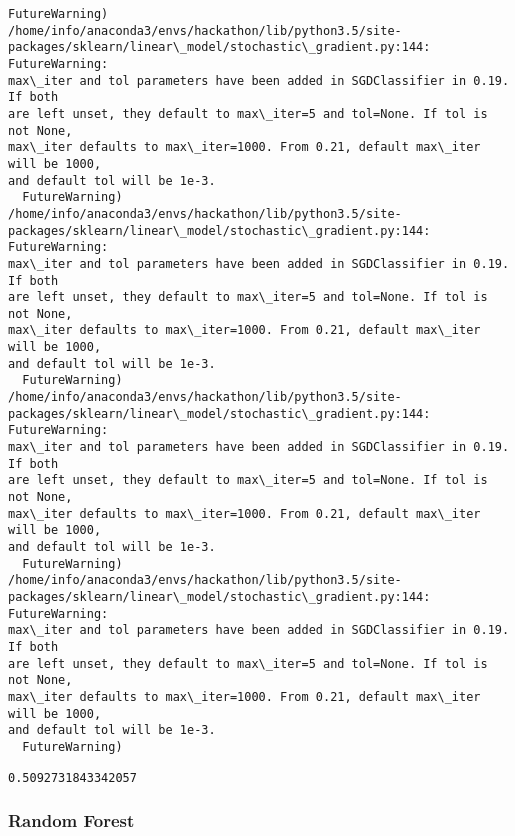 \documentclass[11pt]{article}
\newcommand{\prompt}[4]{
        \llap{{\color{#2}[#3]: #4}}\vspace{-1.25em}
    }
\begin{document}
\begin{Verbatim}[commandchars=\\\{\}]
  FutureWarning)
/home/info/anaconda3/envs/hackathon/lib/python3.5/site-
packages/sklearn/linear\_model/stochastic\_gradient.py:144: FutureWarning:
max\_iter and tol parameters have been added in SGDClassifier in 0.19. If both
are left unset, they default to max\_iter=5 and tol=None. If tol is not None,
max\_iter defaults to max\_iter=1000. From 0.21, default max\_iter will be 1000,
and default tol will be 1e-3.
  FutureWarning)
/home/info/anaconda3/envs/hackathon/lib/python3.5/site-
packages/sklearn/linear\_model/stochastic\_gradient.py:144: FutureWarning:
max\_iter and tol parameters have been added in SGDClassifier in 0.19. If both
are left unset, they default to max\_iter=5 and tol=None. If tol is not None,
max\_iter defaults to max\_iter=1000. From 0.21, default max\_iter will be 1000,
and default tol will be 1e-3.
  FutureWarning)
/home/info/anaconda3/envs/hackathon/lib/python3.5/site-
packages/sklearn/linear\_model/stochastic\_gradient.py:144: FutureWarning:
max\_iter and tol parameters have been added in SGDClassifier in 0.19. If both
are left unset, they default to max\_iter=5 and tol=None. If tol is not None,
max\_iter defaults to max\_iter=1000. From 0.21, default max\_iter will be 1000,
and default tol will be 1e-3.
  FutureWarning)
/home/info/anaconda3/envs/hackathon/lib/python3.5/site-
packages/sklearn/linear\_model/stochastic\_gradient.py:144: FutureWarning:
max\_iter and tol parameters have been added in SGDClassifier in 0.19. If both
are left unset, they default to max\_iter=5 and tol=None. If tol is not None,
max\_iter defaults to max\_iter=1000. From 0.21, default max\_iter will be 1000,
and default tol will be 1e-3.
  FutureWarning)
\end{Verbatim}

            \begin{tcolorbox}[breakable, boxrule=.5pt, size=fbox, pad at break*=1mm, opacityfill=0]
\prompt{Out}{outcolor}{177}{\hspace{3.5pt}}
\begin{Verbatim}[commandchars=\\\{\}]
0.5092731843342057
\end{Verbatim}
\end{tcolorbox}
        
    \hypertarget{random-forest}{%
\subsubsection{Random Forest}\label{random-forest}}
\end{document}
